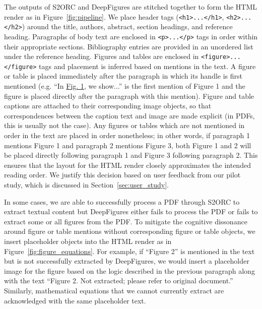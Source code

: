 The outputs of S2ORC and DeepFigures are stitched together to form the HTML render as in Figure~\ref{fig:pipeline}. We place header tags (\texttt{<h1>...</h1>}, \texttt{<h2>...</h2>}) around the title, authors, abstract, section headings, and reference heading. Paragraphs of body text are enclosed in \texttt{<p>...</p>} tags in order within their appropriate sections. Bibliography entries are provided in an unordered list under the reference heading. Figures and tables are enclosed in \texttt{<figure>...} \texttt{</figure>} tags and placement is inferred based on mentions in the text. A figure or table is placed immediately after the paragraph in which its handle is first mentioned (e.g. ``In \underline{Fig. 1}, we show...'' is the first mention of Figure 1 and the figure is placed directly after the paragraph with this mention). Figure and table captions are attached to their corresponding image objects, so that correspondences between the caption text and image are made explicit (in PDFs, this is usually not the case). Any figures or tables which are not mentioned in order in the text are placed in order nonetheless; in other words, if paragraph 1 mentions Figure 1 and paragraph 2 mentions Figure 3, both Figure 1 and 2 will be placed directly following paragraph 1 and Figure 3 following paragraph 2. This ensures that the layout for the HTML render closely approximates the intended reading order. We justify this decision based on user feedback from our pilot study, which is discussed in Section~\ref{sec:user_study}. 

In some cases, we are able to successfully process a PDF through S2ORC to extract textual content but DeepFigures either fails to process the PDF or fails to extract some or all figures from the PDF. To mitigate the cognitive dissonance around figure or table mentions without corresponding figure or table objects, we insert placeholder objects into the HTML render as in Figure~\ref{fig:figure_equations}. For example, if ``Figure 2'' is mentioned in the text but is not successfully extracted by DeepFigures, we would insert a placeholder image for the figure based on the logic described in the previous paragraph along with the text ``Figure 2. Not extracted; please refer to original document.'' Similarly, mathematical equations that we cannot currently extract are acknowledged with the same placeholder text.

